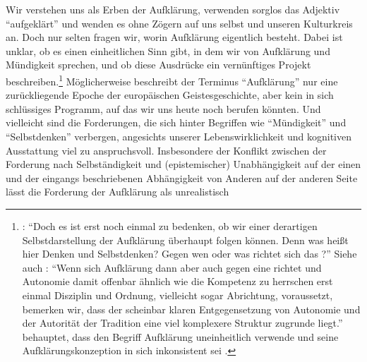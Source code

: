 Wir verstehen uns als Erben der Aufklärung, verwenden sorglos das Adjektiv
\enquote{aufgeklärt} und wenden es ohne Zögern auf uns selbst und
unseren Kulturkreis an. Doch nur selten  fragen wir, worin  Aufklärung
eigentlich besteht. Dabei ist unklar, ob es einen einheitlichen
Sinn gibt, in dem wir von Aufklärung und Mündigkeit sprechen, und ob diese
Ausdrücke ein vernünftiges Projekt
beschreiben.\footnote{\cite[Vgl.][41]{Stekeler-Weithofer:Denken2012}:
\enquote{Doch es ist erst noch einmal zu bedenken, ob wir einer derartigen
Selbstdarstellung der Aufklärung überhaupt folgen können. Denn was heißt hier
Denken und Selbstdenken? Gegen wen oder was richtet sich das
?} Siehe auch \cite[][42]{Stekeler-Weithofer:Denken2012}:
\enquote{Wenn sich Aufklärung dann aber auch gegen eine 
richtet und Autonomie damit offenbar ähnlich wie die Kompetenz zu herrschen erst
einmal Disziplin und Ordnung, vielleicht sogar Abrichtung, voraussetzt, bemerken
wir, dass der scheinbar klaren Entgegensetzung von Autonomie und der Autorität
der Tradition eine viel komplexere Struktur zugrunde liegt.} 
behauptet, dass  den Begriff Aufklärung uneinheitlich
verwende und seine Aufklärungskonzeption in sich inkonsistent
sei \parencite[vgl.][265--272]{Stuke:Aufklaerung1972}.} Möglicherweise
beschreibt der Terminus \enquote{Aufklärung} nur eine zurückliegende Epoche der
europäischen Geistesgeschichte, aber kein in sich schlüssiges Programm, auf das wir
uns heute noch berufen könnten. Und vielleicht sind die Forderungen, die sich
hinter Begriffen wie \enquote{Mündigkeit} und \enquote{Selbstdenken} verbergen,
angesichts unserer Lebenswirklichkeit und kognitiven Ausstattung viel zu
anspruchsvoll. Insbesondere der Konflikt zwischen der Forderung nach
Selbständigkeit und (epistemischer) Unabhängigkeit auf der einen und der
eingangs beschriebenen Abhängigkeit von Anderen auf der anderen Seite lässt die
Forderung der Aufklärung als unrealistisch
